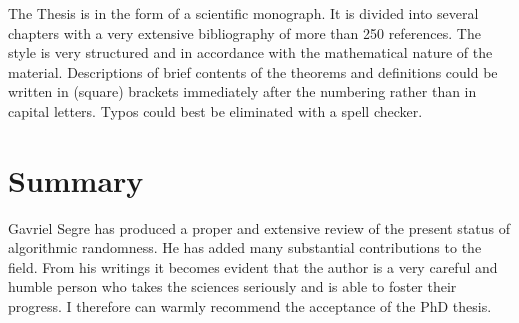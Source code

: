 The Thesis is in the form of a scientific monograph.
It is divided into several chapters with
a very extensive bibliography of more than 250 references.
The style is very structured and in accordance with the mathematical
nature of the material. Descriptions of brief contents of the
theorems and definitions could be written in (square) brackets immediately
after the numbering rather than in capital letters.
Typos could best be eliminated with a spell checker.

\section{Summary}

Gavriel Segre has produced a proper and extensive review of
the present status of algorithmic randomness.
He has added many substantial contributions to the field.
From his writings it becomes evident that the author
is a very  careful and humble person who takes the sciences seriously
and is able to foster their progress.
I therefore can warmly recommend the acceptance of the PhD thesis.


